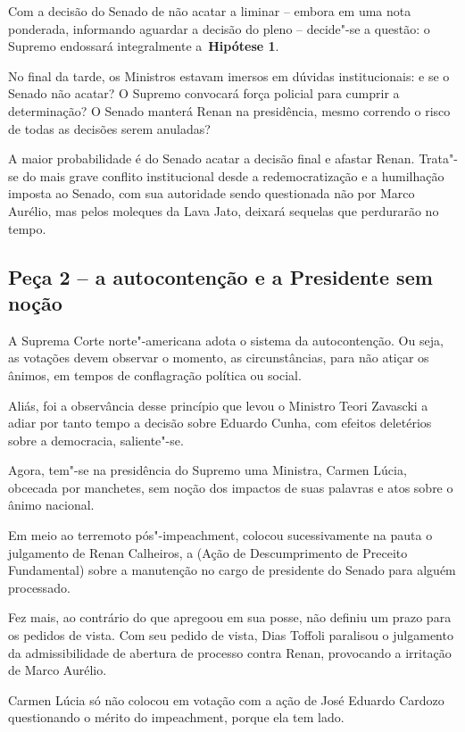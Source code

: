 Com a decisão do Senado de não acatar a liminar -- embora em uma nota
ponderada, informando aguardar a decisão do pleno -- decide"-se a
questão: o Supremo endossará integralmente a~\textbf{Hipótese 1}.

No final da tarde, os Ministros estavam imersos em dúvidas
institucionais: e se o Senado não acatar? O Supremo convocará força
policial para cumprir a determinação? O Senado manterá Renan na
presidência, mesmo correndo o risco de todas as decisões serem anuladas?

A maior probabilidade é do Senado acatar a decisão final e afastar
Renan. Trata"-se do mais grave conflito institucional desde a
redemocratização e a humilhação imposta ao Senado, com sua autoridade
sendo questionada não por Marco Aurélio, mas pelos moleques da Lava
Jato, deixará sequelas que perdurarão no tempo.

\subsection{\textbf{Peça 2 -- a autocontenção e a Presidente sem noção}}

A Suprema Corte norte"-americana adota o sistema da autocontenção. Ou
seja, as votações devem observar o momento, as circunstâncias, para não
atiçar os ânimos, em tempos de conflagração política ou social.

Aliás, foi a observância desse princípio que levou o Ministro Teori
Zavascki a adiar por tanto tempo a decisão sobre Eduardo Cunha, com
efeitos deletérios sobre a democracia, saliente"-se.

Agora, tem"-se na presidência do Supremo uma Ministra, Carmen Lúcia,
obcecada por manchetes, sem noção dos impactos de suas palavras e atos
sobre o ânimo nacional.

Em meio ao terremoto pós"-impeachment, colocou sucessivamente na pauta o
julgamento de Renan Calheiros, a  (Ação de Descumprimento de
Preceito Fundamental) sobre a manutenção no cargo de presidente do
Senado para alguém processado.

Fez mais, ao contrário do que apregoou em sua posse, não definiu um
prazo para os pedidos de vista. Com seu pedido de vista, Dias Toffoli
paralisou o julgamento da admissibilidade de abertura de processo contra
Renan, provocando a irritação de Marco Aurélio.

Carmen Lúcia só não colocou em votação com a ação de José Eduardo
Cardozo questionando o mérito do impeachment, porque ela tem lado.

